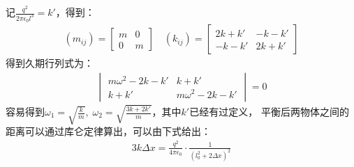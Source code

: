\documentclass[a4paper]{ctexart}
\begin{document}
    记$\frac{q^{2}}{2\pi\epsilon_{0}l^{3}} = k'$，得到：
    \begin{gather}
        (m_{ij}) = 
            \begin{bmatrix}
                m & 0\\
                0 & m
            \end{bmatrix}
            \quad
        (k_{ij}) = 
            \begin{bmatrix}
                2k + k' & -k - k'\\
                -k - k' & 2k + k'
            \end{bmatrix}
    \end{gather}
    得到久期行列式为：
    \begin{gather}
        \begin{vmatrix}
            m\omega^{2} - 2k - k' & k + k'\\
            k + k' & m\omega^{2} - 2k - k'
        \end{vmatrix}
        =0
    \end{gather}
    容易得到$\omega_{1} = \sqrt{\frac{k}{m}},\;\omega_{2} = \sqrt{\frac{3k + 2k'}{m}}$，其中$k'$已经有过定义，
    平衡后两物体之间的距离可以通过库仑定律算出，可以由下式给出：
    \begin{align}
        3k\Delta x = \frac{q^{2}}{4\pi\epsilon_{0}}\cdot\frac{1}{(l_{0}^{2} + 2 \Delta x )^{2}}
    \end{align}
\end{document}
